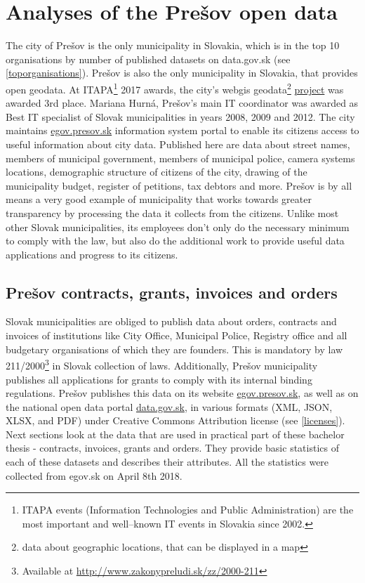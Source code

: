 \documentclass[thesis=B,english]{FITthesis}[2012/06/26]
\begin{document}
	
\chapter{Analyses of the Prešov open data}
\label{presovopendata}
	The city of Prešov is the only municipality in Slovakia, which is in the top 10 organisations by number of published datasets on data.gov.sk (see \ref{toporganisations}). Prešov is also the only municipality in Slovakia, that provides open geodata. At ITAPA\footnote{ITAPA events (Information Technologies and Public Administration) are the most important and well–known IT events in Slovakia since 2002.\cite{itapa}} 2017 awards, the city's webgis geodata\footnote{data about geographic locations, that can be displayed in a map} \href{http://webgis.presov.sk/}{project} was awarded 3rd place. Mariana Hurná, Prešov's main IT coordinator was awarded as Best IT specialist of Slovak municipalities in years 2008, 2009 and 2012. The city maintains \href{http://egov.presov.sk}{egov.presov.sk} information system  portal to enable its citizens access to useful information about city data. Published here are data about street names, members of municipal government, members of municipal police, camera systems locations, demographic structure of citizens of the city, drawing of the municipality budget, register of petitions, tax debtors and more. Prešov is by all means a very good example of municipality that works towards greater  transparency by processing the data it collects from the citizens. Unlike most other Slovak municipalities, its employees don't only do the necessary minimum to comply with the law, but also do the additional work to provide useful data applications and progress to its citizens.
	
	\section{Prešov contracts, grants, invoices and orders}
	\label{presovdataattributes}
	Slovak municipalities are obliged to publish data about orders, contracts and invoices of institutions like City Office, Municipal Police, Registry office and all budgetary organisations of which they are founders. This is mandatory by law 211/2000\footnote{Available at \url{http://www.zakonypreludi.sk/zz/2000-211}} in Slovak collection of laws. Additionally, Prešov municipality  publishes all applications for grants to comply with its internal binding regulations. Prešov publishes this data on its website \url{egov.presov.sk}, as well as on the national open data portal \url{data.gov.sk}, in various formats (XML, JSON, XLSX, and PDF) under Creative Commons Attribution license (see \ref{licenses}). Next sections look at the data that are used in practical part of these bachelor thesis - contracts, invoices, grants and orders. They provide basic statistics of each of these datasets and describes their attributes. All the statistics were collected from egov.sk on April 8th 2018.
\end{document}
